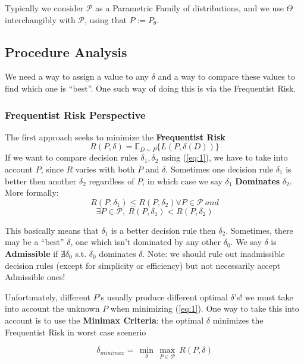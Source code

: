 \documentclass[]{article}
\begin{document}
Typically we consider \(\mathcal{P}\) as a Parametric Family of distributions, and we use \(\Theta\) interchangibly with \(\mathcal{P}\), using that \(P := P_{\theta}\).

\subsection{Procedure Analysis}

We need a way to assign a value to any \(\delta\) and a way to compare these values to find which one is ``best''. One such way of doing this is via the Frequentist Risk.

\subsubsection{Frequentist Risk Perspective} 
The first approach seeks to minimize the \textbf{Frequentist Risk}  
\begin{equation}\label{eq:1}
	R(P,\delta)=\mathbb{E}_{D\sim P}\{L(P,\delta(D))\}
\end{equation}
If we want to compare decision rules \(\delta_1, \delta_2\) using (\ref{eq:1}), we have to take into account \(P\), since \(R\) varies with both \(P\) and \(\delta\). Sometimes one decision rule \(\delta_1\) is better then another \(\delta_2\) regardless of \(P\), in which case we say \(\delta_1\) \textbf{Dominates} \(\delta_2\).
More formally:
$$R(P,\delta_1)\leq R(P,\delta_2) \forall P \in \mathcal{P}\ and$$
$$\exists P \in \mathcal{P},\ R(P,\delta_1) < R(P, \delta_2)$$

This basically means that \(\delta_1\) is a better decision rule then \(\delta_2\). Sometimes, there may be a ``best'' \(\delta\), one which isn't dominated by any other \(\delta_0\). We say \(\delta\) is \textbf{Admissible} if $\nexists \delta_0$ s.t. $\delta_0$ dominates $\delta$. Note: we should rule out inadmissible decision rules (except for simplicity or efficiency) but not necessarily accept Admissible ones!

Unfortunately, different \(P\)'s usually produce different optimal \(\delta\)'s! we must take into account the unknown \(P\) when minimizing (\ref{eq:1}). One way to take this into account is to use the \textbf{Minimax Criteria}: the optimal \(\delta\) minimizes the Frequentist Risk in worst case scenerio

\begin{equation}
\delta_{minimax} = \,\min\limits_{\delta}\,\max\limits_{P \in \mathcal{P}}\ R(P,\delta)
\end{equation}
\end{document}
